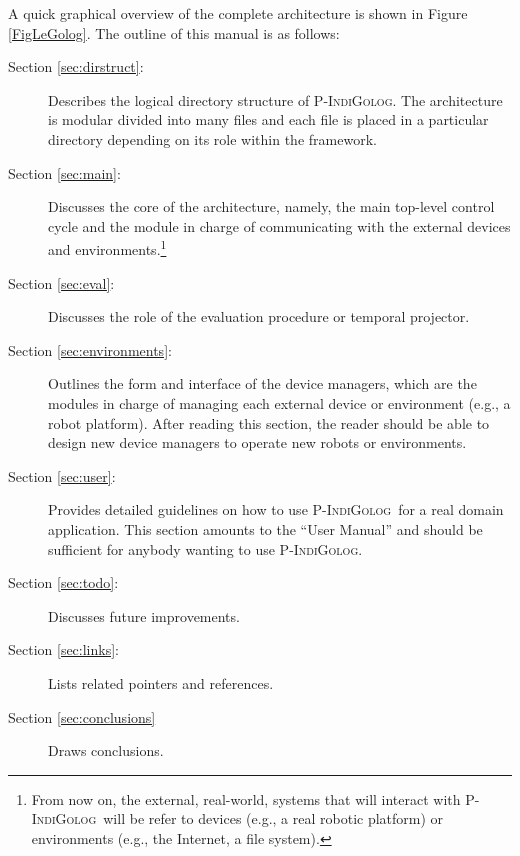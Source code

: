\documentclass[11pt]{article}
\newcommand{\PIndiGolog}{\mbox{\textsc{P-IndiGolog}}}
\begin{document}
A quick graphical overview of the complete architecture is shown in Figure
\ref{FigLeGolog}. The outline of this manual is as follows: 
%
\begin{description}
\item[Section \ref{sec:dirstruct}:] Describes the logical directory structure of
\PIndiGolog. The architecture is modular divided into many files and each file
is placed in a particular directory depending on its role within the framework.

\item[Section \ref{sec:main}:] Discusses the core of the architecture, namely,
the main top-level control cycle and the module in charge of communicating with
the external devices and environments.\footnote{From now on, the external,
real-world, systems that will interact with \PIndiGolog\ will be refer to
devices (e.g., a real robotic platform) or environments (e.g., the Internet, a
file system).} 

\item[Section \ref{sec:eval}:] Discusses the role of the evaluation procedure
or temporal projector.

\item[Section \ref{sec:environments}:] Outlines the form and interface of the
device managers, which are the modules in charge of managing each external
device or environment (e.g., a robot platform). After reading this section, the
reader should be able to design new device managers to operate new robots or
environments.

\item[Section \ref{sec:user}:] Provides detailed guidelines on how to
use \PIndiGolog\ for a real domain application. This section amounts to
the ``User Manual'' and should be sufficient for anybody wanting to use
\PIndiGolog.

\item[Section \ref{sec:todo}:] Discusses future improvements.

\item[Section \ref{sec:links}:] Lists related pointers and references.

\item[Section \ref{sec:conclusions}] Draws conclusions.
\end{description}
\end{document}
